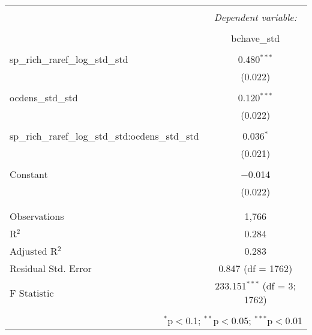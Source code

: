 
\begin{table}[!htbp] \centering 
  \caption{} 
  \label{soil_div_int_mod} 
\begin{tabular}{@{\extracolsep{5pt}}lc} 
\\[-1.8ex]\hline 
\hline \\[-1.8ex] 
 & \multicolumn{1}{c}{\textit{Dependent variable:}} \\ 
\cline{2-2} 
\\[-1.8ex] & bchave\_std \\ 
\hline \\[-1.8ex] 
 sp\_rich\_raref\_log\_std\_std & 0.480$^{***}$ \\ 
  & (0.022) \\ 
  & \\ 
 ocdens\_std\_std & 0.120$^{***}$ \\ 
  & (0.022) \\ 
  & \\ 
 sp\_rich\_raref\_log\_std\_std:ocdens\_std\_std & 0.036$^{*}$ \\ 
  & (0.021) \\ 
  & \\ 
 Constant & $-$0.014 \\ 
  & (0.022) \\ 
  & \\ 
\hline \\[-1.8ex] 
Observations & 1,766 \\ 
R$^{2}$ & 0.284 \\ 
Adjusted R$^{2}$ & 0.283 \\ 
Residual Std. Error & 0.847 (df = 1762) \\ 
F Statistic & 233.151$^{***}$ (df = 3; 1762) \\ 
\hline 
\hline \\[-1.8ex] 
\multicolumn{2}{r}{$^{*}$p$<$0.1; $^{**}$p$<$0.05; $^{***}$p$<$0.01} \\ 
\end{tabular} 
\end{table} 
